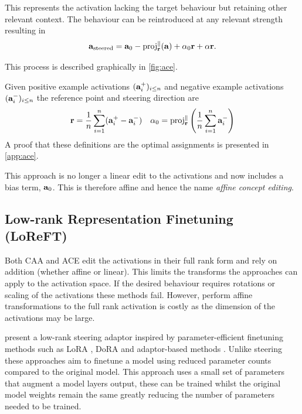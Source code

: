 This represents the activation lacking the target behaviour but retaining other relevant context.
The behaviour can be reintroduced at any relevant strength resulting in
\begin{equation}
    \label{eq:ace}
    \mathbf{a}_\text{steered} = \mathbf{a}_0 - \text{proj}_{\mathbf{r}}^{\parallel}(\mathbf{a}) + \alpha_0\mathbf{r} + \alpha\mathbf{r}.
\end{equation}

This process is described graphically in \cref{fig:ace}.

Given positive example activations $(\mathbf{a}_i^+)_{i\le n}$ and negative example activations $(\mathbf{a}_i^-)_{i\le n}$ the reference point and steering direction are
\begin{align*}
    \mathbf{r} = \frac{1}{n}\sum_{i=1}^{n}(\mathbf{a}_i^+ - \mathbf{a}_i^-) && \alpha_0 = \text{proj}_{\mathbf{r}}^\parallel\left(\frac{1}{n}\sum_{i=1}^{n}\mathbf{a}_i^-\right)
\end{align*}
A proof that these definitions are the optimal assignments is presented in \cref{app:ace}.

This approach is no longer a linear edit to the activations and now includes a bias term, $\mathbf{a}_0$.
This is therefore affine and hence the name \emph{affine concept editing}.

\subsection{Low-rank Representation Finetuning (LoReFT)}
\label{loreft}

Both CAA \citep{caa} and ACE \citep{ace} edit the activations in their full rank form and rely on addition (whether affine or linear).
This limits the transforms the approaches can apply to the activation space.
If the desired behaviour requires rotations or scaling of the activations these methods fail.
However, perform affine transformations to the full rank activation is costly as the dimension of the activations may be large.

\citet{reft} present a low-rank steering adaptor inspired by parameter-efficient finetuning methods such as LoRA \citep{lora}, DoRA \citep{dora} and adaptor-based methods \citep{petl}.
Unlike steering these approaches aim to finetune a model using reduced parameter counts compared to the original model.
This approach uses a small set of parameters that augment a model layers output, these can be trained whilst the original model weights remain the same greatly reducing the number of parameters needed to be trained.

